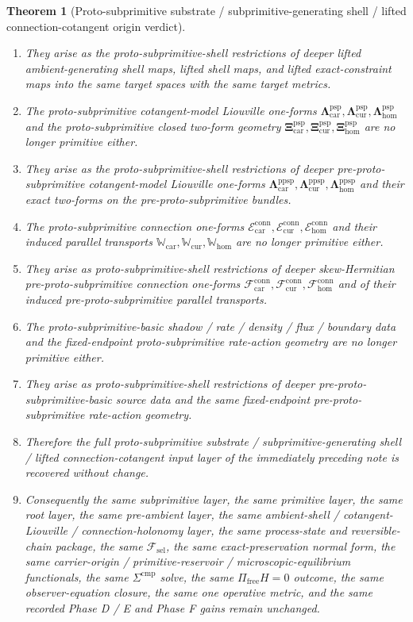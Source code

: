 \documentclass[11pt]{article}
\newcommand{\StemFunctional}{\mathscr F_{\mathrm{sel}}}
\newcommand{\Car}{\mathrm{car}}
\newcommand{\Cur}{\mathrm{cur}}
\newcommand{\Hom}{\mathrm{hom}}
\newcommand{\ProtoSubprimLiouville}[1]{\boldsymbol{\Lambda}_{#1}^{\mathrm{psp}}}
\newcommand{\ProtoSubprimTwo}[1]{\boldsymbol{\Xi}_{#1}^{\mathrm{psp}}}
\newcommand{\ProtoSubprimConnectionForm}[1]{\mathcal E_{#1}^{\mathrm{conn}}}
\newcommand{\ProtoSubprimTransport}[1]{\mathbb W_{#1}}
\newcommand{\PreProtoSubprimLiouville}[1]{\boldsymbol{\Lambda}_{#1}^{\mathrm{ppsp}}}
\newcommand{\PreProtoSubprimConnectionForm}[1]{\mathcal F_{#1}^{\mathrm{conn}}}
\newtheorem{theorem}{Theorem}
\begin{document}
\begin{theorem}[Proto-subprimitive substrate / subprimitive-generating shell / lifted connection-cotangent origin verdict]
\begin{enumerate}
    \item They arise as the proto-subprimitive-shell restrictions of deeper lifted ambient-generating shell maps, lifted shell maps, and lifted exact-constraint maps into the same target spaces with the same target metrics.
    \item The proto-subprimitive cotangent-model Liouville one-forms \(\ProtoSubprimLiouville{\Car},\ProtoSubprimLiouville{\Cur},\ProtoSubprimLiouville{\Hom}\) and the proto-subprimitive closed two-form geometry \(\ProtoSubprimTwo{\Car},\ProtoSubprimTwo{\Cur},\ProtoSubprimTwo{\Hom}\) are no longer primitive either.
    \item They arise as the proto-subprimitive-shell restrictions of deeper pre-proto-subprimitive cotangent-model Liouville one-forms \(\PreProtoSubprimLiouville{\Car},\PreProtoSubprimLiouville{\Cur},\PreProtoSubprimLiouville{\Hom}\) and their exact two-forms on the pre-proto-subprimitive bundles.
    \item The proto-subprimitive connection one-forms \(\ProtoSubprimConnectionForm{\Car},\ProtoSubprimConnectionForm{\Cur},\ProtoSubprimConnectionForm{\Hom}\) and their induced parallel transports \(\ProtoSubprimTransport{\Car},\ProtoSubprimTransport{\Cur},\ProtoSubprimTransport{\Hom}\) are no longer primitive either.
    \item They arise as proto-subprimitive-shell restrictions of deeper skew-Hermitian pre-proto-subprimitive connection one-forms \(\PreProtoSubprimConnectionForm{\Car},\PreProtoSubprimConnectionForm{\Cur},\PreProtoSubprimConnectionForm{\Hom}\) and of their induced pre-proto-subprimitive parallel transports.
    \item The proto-subprimitive-basic shadow / rate / density / flux / boundary data and the fixed-endpoint proto-subprimitive rate-action geometry are no longer primitive either.
    \item They arise as proto-subprimitive-shell restrictions of deeper pre-proto-subprimitive-basic source data and the same fixed-endpoint pre-proto-subprimitive rate-action geometry.
    \item Therefore the full proto-subprimitive substrate / subprimitive-generating shell / lifted connection-cotangent input layer of the immediately preceding note is recovered without change.
    \item Consequently the same subprimitive layer, the same primitive layer, the same root layer, the same pre-ambient layer, the same ambient-shell / cotangent-Liouville / connection-holonomy layer, the same process-state and reversible-chain package, the same \(\StemFunctional\), the same exact-preservation normal form, the same carrier-origin / primitive-reservoir / microscopic-equilibrium functionals, the same \(\Sigma^{\mathrm{cmp}}\) solve, the same \(\Pi_{\mathrm{free}}H=0\) outcome, the same observer-equation closure, the same one operative metric, and the same recorded Phase D / E and Phase F gains remain unchanged.

\end{enumerate}
\end{theorem}
\end{document}
